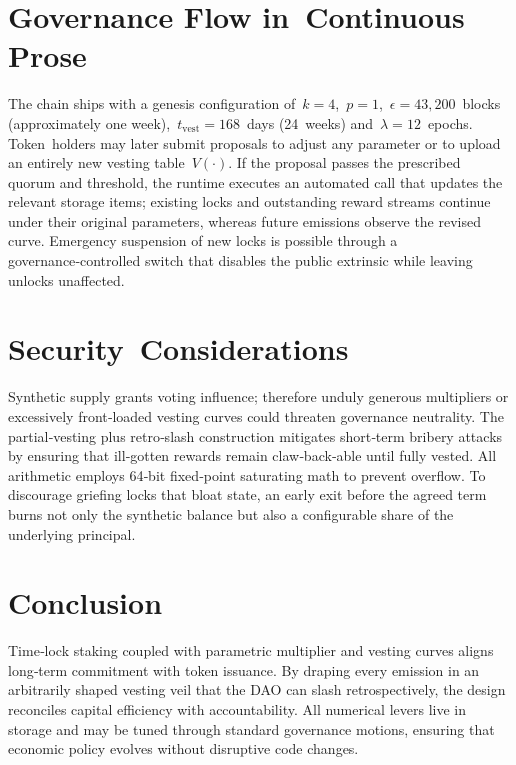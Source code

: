 \documentclass[11pt]{article}
\begin{document}
\section{Governance Flow in Continuous Prose}
The chain ships with a genesis configuration of \(k=4\), \(p=1\), \(\epsilon=43{,}200\)~blocks (approximately one week), \(t_{\text{vest}}=168\)~days (24 weeks) and \(\lambda=12\)~epochs. Token holders may later submit proposals to adjust any parameter or to upload an entirely new vesting table~\(V(\cdot)\). If the proposal passes the prescribed quorum and threshold, the runtime executes an automated call that updates the relevant storage items; existing locks and outstanding reward streams continue under their original parameters, whereas future emissions observe the revised curve. Emergency suspension of new locks is possible through a governance‑controlled switch that disables the public extrinsic while leaving unlocks unaffected.

\section{Security Considerations}
Synthetic supply grants voting influence; therefore unduly generous multipliers or excessively front‑loaded vesting curves could threaten governance neutrality. The partial‑vesting plus retro‑slash construction mitigates short‑term bribery attacks by ensuring that ill‑gotten rewards remain claw‑back‑able until fully vested. All arithmetic employs 64‑bit fixed‑point saturating math to prevent overflow. To discourage griefing locks that bloat state, an early exit before the agreed term burns not only the synthetic balance but also a configurable share of the underlying principal.

\section{Conclusion}
Time‑lock staking coupled with parametric multiplier and vesting curves aligns long‑term commitment with token issuance. By draping every emission in an arbitrarily shaped vesting veil that the DAO can slash retrospectively, the design reconciles capital efficiency with accountability. All numerical levers live in storage and may be tuned through standard governance motions, ensuring that economic policy evolves without disruptive code changes.
\end{document}

